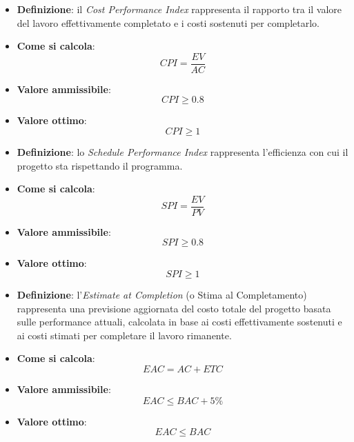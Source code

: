 \begin{itemize}
	\item \textbf{Definizione}: il \textit{Cost Performance Index} rappresenta il rapporto tra il valore del lavoro effettivamente completato e i costi sostenuti per completarlo.
	\item \textbf{Come si calcola}: \begin{equation*}CPI = \frac{EV}{AC}\end{equation*}
	\item \textbf{Valore ammissibile}: \begin{equation*}CPI \geq 0.8\end{equation*}
	\item \textbf{Valore ottimo}: \begin{equation*}CPI \geq 1\end{equation*}
\end{itemize}

\begin{itemize}
	\item \textbf{Definizione}: lo \textit{Schedule Performance Index} rappresenta l'efficienza con cui il progetto sta rispettando il programma.
	\item \textbf{Come si calcola}: \begin{equation*}SPI = \frac{EV}{PV}\end{equation*}
	\item \textbf{Valore ammissibile}: \begin{equation*}SPI \geq 0.8\end{equation*}
	\item \textbf{Valore ottimo}: \begin{equation*}SPI \geq 1\end{equation*}
\end{itemize}

\begin{itemize}
	\item \textbf{Definizione}: l'\textit{Estimate at Completion} (o Stima al Completamento) rappresenta una previsione aggiornata del costo totale del progetto basata sulle performance attuali, calcolata in base ai costi effettivamente sostenuti e ai costi stimati per completare il lavoro rimanente.
	\item \textbf{Come si calcola}: \begin{equation*}EAC = AC + ETC\end{equation*}
	\item \textbf{Valore ammissibile}: \begin{equation*}EAC \leq BAC + 5\%\end{equation*}
	\item \textbf{Valore ottimo}: \begin{equation*}EAC \leq BAC\end{equation*}
\end{itemize}


